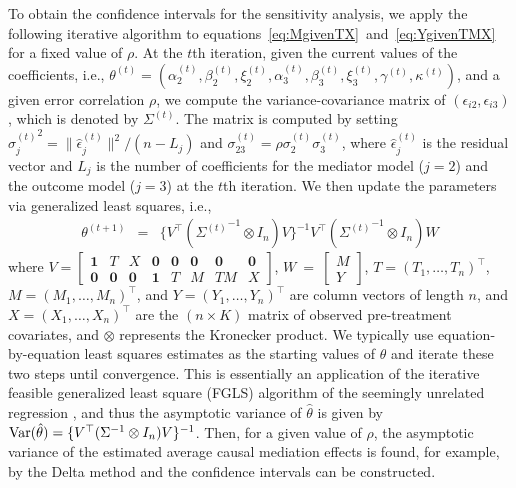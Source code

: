 \documentclass[11pt,letterpaper]{article}
\theoremstyle{plain}
\providecommand{\norm}[1]{\lVert#1\rVert}
\renewcommand\r{\right}
\renewcommand\l{\left}
\newcommand\var{{\rm Var}}
\begin{document}
To obtain the confidence intervals for the sensitivity analysis, we
apply the following iterative algorithm to
equations~\eqref{eq:MgivenTX}~and~\eqref{eq:YgivenTMX} for a fixed
value of $\rho$.  At the $t$th iteration, given the current values of
the coefficients, i.e., $\theta^{(t)}=(\alpha_2^{(t)}, \beta_2^{(t)},
\xi_2^{(t)}, \alpha_3^{(t)},
\beta_3^{(t)},\xi_3^{(t)},\gamma^{(t)},\kappa^{(t)})$, and a given
error correlation $\rho$, we compute the variance-covariance matrix of
$(\epsilon_{i2},\epsilon_{i3})$, which is denoted by $\Sigma^{(t)}$.
The matrix is computed by setting
${\sigma_j^{(t)}}^2=\norm{\hat{\epsilon}_j^{(t)}}^2/(n-L_j)$ and
$\sigma_{23}^{(t)}=\rho \sigma_2^{(t)}\sigma_3^{(t)}$, where
$\hat\epsilon_j^{(t)}$ is the residual vector and $L_j$ is the number
of coefficients for the mediator model ($j=2$) and the outcome model
($j=3$) at the $t$th iteration.  We then update the parameters via
generalized least squares, i.e.,
\begin{eqnarray*}
  \theta^{(t+1)} & = & \{V^\top ({\Sigma^{(t)}}^{-1} \otimes I_n)V\}^{-1}
  V^\top ({\Sigma^{(t)}}^{-1} \otimes I_n)W
\end{eqnarray*}
where
$V  =  \l[\begin{array}{cccccccc} \mathbf{1} &  T & X & \mathbf{0} & \mathbf{0} & \mathbf{0} & \mathbf{0} & \mathbf{0} \\
  \mathbf{0} & \mathbf{0} & \mathbf{0} & \mathbf{1} & T & M & TM & X
\end{array} \r]$,
$W \ = \ \l[\begin{array}{c} M \\
  Y
\end{array} \r]$, $T=(T_1,\dots,T_n)^\top$, $M=(M_1,\dots,M_n)^\top$, and
$Y=(Y_1,\dots,Y_n)^\top$ are column vectors of length $n$, and $X = (X_1, \dots, X_n)^\top$ are the $(n \times K)$ matrix of observed pre-treatment covariates, and $\otimes$ represents the Kronecker product. We typically use
equation-by-equation least squares estimates as the starting values of $\theta$
and iterate these two steps until convergence.  This is essentially an
application of the iterative feasible generalized least square (FGLS) algorithm of the
seemingly unrelated regression \citep{zell:62}, and thus the asymptotic variance
of $\hat\theta$ is given by $\var(\hat\theta) = \{V^\top (\Sigma^{-1} \otimes
I_n) V\}^{-1}$. Then, for a given value of $\rho$, the asymptotic variance of the estimated average causal mediation effects
is found, for example, by the Delta method and the confidence intervals can be constructed.
\end{document}
